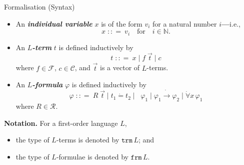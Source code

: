 \documentclass[serif,table,10pt]{beamer}
\newcommand{\IN}{\mathbb{N}}
\newcommand{\0}{\texttt{0}}
\newcommand{\1}{\texttt{1}}
\newcommand{\inlinedef}[1]{\emph{\textbf{#1}}}
\newcommand{\bnfis}{\mathrel{\;{:}{:}{=}\ }}
\newcommand{\bnfor}{\mathrel{\;\big|\; }}
\newcommand{\Leq}{\mathrel{\dot{=}}}
\newcommand{\Lneg}{\mathop{\dot{\neg}}}
\newcommand{\Lto}{\mathrel{\dot{\to}}}
\newcommand{\Lall}[1]{\dot{\forall}#1\,}
\begin{document}
\begin{frame}{Formalisation (Syntax)}

    \begin{itemize}
        \item An \inlinedef{individual variable} $x$ is of the form $v_i$ for a natural number $i$\textbf{---}i.e., \[ x \bnfis v_i \quad \mathrm{for} \quad i \in \IN . \]
        \item An \inlinedef{$L$-term} $t$ is defined inductively by \[t \bnfis x \bnfor f \; \vec{t} \bnfor c\] where $f \in \mathcal{F}$, $c \in \mathcal{C}$, and $\vec{t}$ is a vector of $L$-terms.
        \item An \inlinedef{$L$-formula} $\varphi$ is defined inductively by \[\varphi \bnfis R \; \vec{t} \bnfor t_1 \Leq t_2 \bnfor \Lneg \varphi_1 \bnfor  \varphi_1  \Lto \varphi_2 \bnfor \Lall{x} \varphi_1\] where $R \in \mathcal{R}$.
    \end{itemize}

    \textbf{Notation.}
    For a first-order language $L$,
    \begin{itemize}
        \item the type of $L$-terms is denoted by $ \mathtt{trm} \, L $; and
        \item the type of $L$-formulae is denoted by $ \mathtt{frm} \, L $.
    \end{itemize}

\end{frame}
\end{document}
